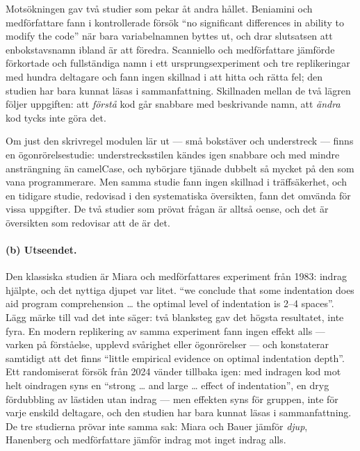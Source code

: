 Motsökningen gav två studier som pekar åt andra hållet.  Beniamini och
medförfattare fann i kontrollerade försök \enquote{\foreignlanguage{%
english}{no significant differences in ability to modify the code}} när
bara variabelnamnen byttes ut, och drar slutsatsen att enbokstavsnamn
ibland är att föredra\autocite[sammanfattningen]{Beniamini2017SingleLetter}.
Scanniello och medförfattare jämförde förkortade och fullständiga namn i
ett ursprungsexperiment och tre replikeringar med hundra deltagare och
fann ingen skillnad i att hitta och rätta fel; den studien har bara
kunnat läsas i sammanfattning\autocite{Scanniello2017Abbreviated}.
Skillnaden mellan de två lägren följer uppgiften: att \emph{förstå} kod
går snabbare med beskrivande namn, att \emph{ändra} kod tycks inte göra
det.

Om just den skrivregel modulen lär ut --- små bokstäver och understreck
--- finns en ögonrörelsestudie: understrecksstilen kändes igen snabbare
och med mindre ansträngning än \foreignlanguage{english}{camelCase}, och
nybörjare tjänade dubbelt så mycket på den som vana
programmerare\autocite[avsnitt~VIII]{SharifMaletic2010CamelCase}.  Men
samma studie fann ingen skillnad i träffsäkerhet, och en tidigare studie,
redovisad i den systematiska översikten, fann det omvända för vissa
uppgifter\autocite[avsnitt~4]{Oliveira2023FormattingSLR}.  De två
studier som prövat frågan är alltså oense, och det är översikten som
redovisar att de är det.

\paragraph{(b) Utseendet.}  Den klassiska studien är Miara och
medförfattares experiment från 1983: indrag hjälpte, och det nyttiga
djupet var litet.  \enquote{\foreignlanguage{english}{we conclude that
some indentation does aid program comprehension \dots{} the optimal level
of indentation is 2--4 spaces}}\autocite[avsnitt~5]{Miara1983Indentation}.
Lägg märke till vad det inte säger: två blanksteg gav det högsta
resultatet, inte fyra.  En modern replikering av samma experiment fann
ingen effekt alls --- varken på förståelse, upplevd svårighet eller
ögonrörelser --- och konstaterar samtidigt att det finns
\enquote{\foreignlanguage{english}{little empirical evidence on optimal
indentation depth}}\autocite[avsnitt~8]{Bauer2019Indentation}.  Ett
randomiserat försök från 2024 vänder tillbaka igen: med indragen kod mot
helt oindragen syns en \enquote{\foreignlanguage{english}{strong \dots{}
and large \dots{} effect of indentation}}, en dryg fördubbling av
lästiden utan indrag --- men effekten syns för gruppen, inte för varje
enskild deltagare, och den studien har bara kunnat läsas i
sammanfattning\autocite[sammanfattningen]{Hanenberg2024Indentation}.  De
tre studierna prövar inte samma sak: Miara och Bauer jämför \emph{djup},
Hanenberg och medförfattare jämför indrag mot inget indrag alls.

